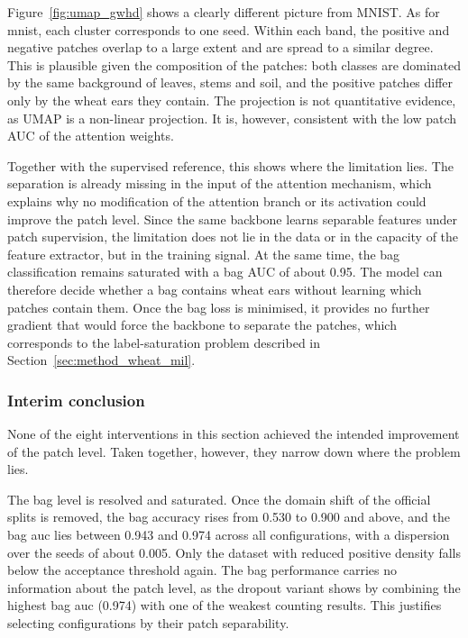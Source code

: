 \documentclass[12pt,parskip = half, DIV=classic,listof=totoc]{scrartcl}
\begin{document}
				Figure~\ref{fig:umap_gwhd} shows a clearly different picture from MNIST. As for \ac{mnist}, each cluster 
				corresponds to one seed. Within each band, the
				positive and negative patches overlap to a large extent and are spread to a
				similar degree. This is plausible given the composition of the
				patches: both classes are dominated by the same background of leaves, stems and
				soil, and the positive patches differ only by the wheat ears they contain. The
				projection is not quantitative evidence, as UMAP is a non-linear projection. It is,
				however, consistent with the low patch AUC of the attention weights.

				Together with the supervised reference, this shows where the limitation lies.
				The separation is already missing in the input of the attention mechanism, which
				explains why no modification of the attention branch or its activation could
				improve the patch level. Since the same backbone learns separable features under
				patch supervision, the limitation does not lie in the data or in the capacity of the
				feature extractor, but in the training signal. At the same time, the bag
				classification remains saturated with a bag AUC of about 0.95. The model can
				therefore decide whether a bag contains wheat ears without learning which patches
				contain them. Once the bag loss is minimised, it provides no further gradient that
				would force the backbone to separate the patches, which corresponds to the
				label-saturation problem described in Section~\ref{sec:method_wheat_mil}.

			\subsubsection{Interim conclusion}\label{sec:gwhd_interim}

			None of the eight interventions in this section achieved the intended improvement of
			the patch level. Taken together, however, they narrow down where the problem lies.

			The bag level is resolved and saturated. Once the domain shift of the official
			splits is removed, the bag accuracy rises from 0.530 to 0.900 and above, and the bag \ac{auc}
			lies between 0.943 and 0.974 across all configurations, with a dispersion over the seeds
			of about 0.005. Only the dataset with reduced positive density falls below the acceptance
			threshold again. The bag performance carries no information about the patch level, as
			the dropout variant shows by combining the highest bag \ac{auc} (0.974) with one of the weakest
			counting results. This justifies selecting configurations by their patch separability.
\end{document}
